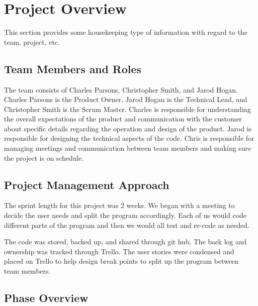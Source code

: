 

\chapter{Project Overview}
This section provides some housekeeping type of information with regard to the 
team, project, etc. 



\section{Team Members and Roles}
The team consists of Charles Parsons, Christopher Smith, and Jarod Hogan. Charles Parsons is the Product Owner, Jarod Hogan is the Technical Lead, and Christopher Smith is the Scrum Master. Charles is responsible for understanding the overall expectations of the product and communication with the customer about specific details regarding the operation and design of the product. Jarod is responsible for designing the technical aspects of the code. Chris is responsible for managing meetings and communication between team members and making sure the project is on schedule.


\section{Project  Management Approach}

	The sprint length for this project was 2 weeks. We began with a meeting to
decide the user needs and split the program accordingly. Each of us would code
different parts of the program and then we would all test and re-code as needed.

	The code was stored, backed up, and shared through git hub. The back log and ownership 
was tracked through Trello. The user stories were condensed and placed on Trello to help 
design break points to split up the program between team members. 

\section{Phase  Overview}


